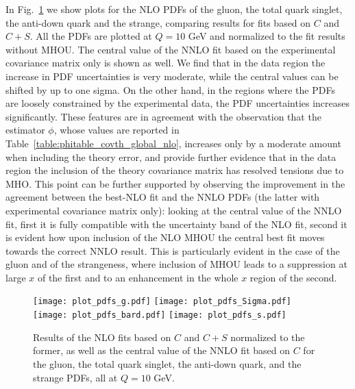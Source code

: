     In Fig.~\ref{fig:pdfs_plots_th_err} we show plots for the NLO PDFs of the gluon, the total quark singlet,
    the anti-down quark and the strange, comparing results for fits based on $C$ and $C+S$.
    All the PDFs are plotted at $Q=10$ GeV and normalized to the fit results without MHOU.
    The central value of the NNLO fit based on the experimental covariance matrix only is shown as well.
    We find that in the data region the increase in PDF uncertainties is very moderate, while the central values 
    can be shifted by up to one sigma. On the other hand, in the regions where the PDFs are loosely constrained by the experimental
    data, the PDF uncertainties increases significantly.
    These features are in agreement with the observation that the estimator $\phi$, whose values are reported 
    in Table~\ref{table:phitable_covth_global_nlo}, increases only by a moderate amount when including the theory error,
    and provide further evidence that in the data region the inclusion of the theory covariance matrix has resolved tensions
    due to MHO.
    This point can be further supported by observing the improvement in the agreement between the best-NLO fit and the NNLO PDFs
    (the latter with experimental covariance matrix only): looking at the central value of the NNLO fit, 
    first it is fully compatible with the uncertainty band of the NLO fit, second it is evident how upon inclusion of 
    the NLO MHOU the central best fit moves towards the correct NNLO result.
    This is particularly evident in the case of the gluon and of the strangeness, where inclusion of MHOU leads to a
    suppression at large $x$ of the first and to an enhancement in the whole $x$ region of the second.  
    \begin{figure}[t!]
        \begin{center}
            \texttt{[image: plot\_pdfs\_g.pdf]}
            \texttt{[image: plot\_pdfs\_Sigma.pdf]}
            \texttt{[image: plot\_pdfs\_bard.pdf]}
            \texttt{[image: plot\_pdfs\_s.pdf]}
            \caption{Results of the NLO fits based on $C$ and $C + S$ normalized to the
            former, as well as the central value of the NNLO fit based on $C$ for the gluon, the total quark singlet, 
            the anti-down quark, and the strange PDFs, all at $Q = 10$ GeV.} 
            \label{fig:pdfs_plots_th_err} 
        \end{center}
    \end{figure}

